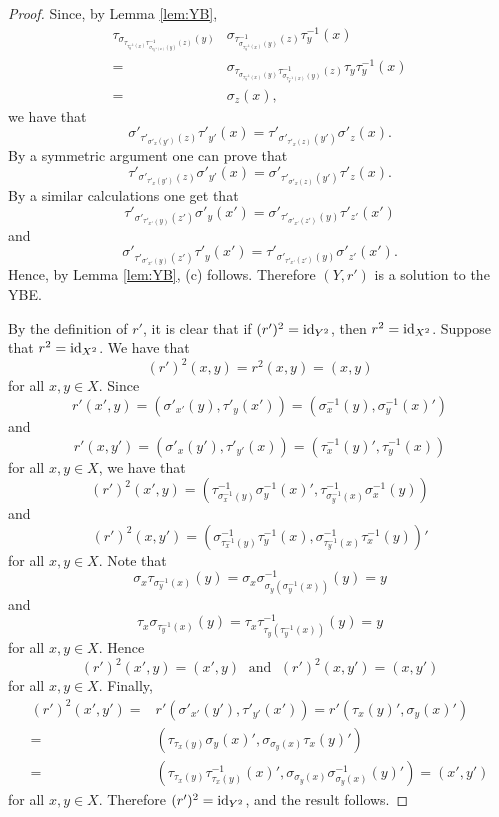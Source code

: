 \begin{proof}
Since, by Lemma \ref{lem:YB},
\begin{align*}
\tau_{\sigma_{\tau_{\tau^{-1}_y(x)}\tau^{-1}_{\sigma_{\tau^{-1}_y(x)}(y)}(z)}(y)}&\sigma_{\tau^{-1}_{\sigma_{\tau^{-1}_y(x)}(y)}(z)}\tau^{-1}_y(x)\\
=&\sigma_{\tau_{\sigma_{\tau^{-1}_y(x)}(y)}\tau^{-1}_{\sigma_{\tau^{-1}_y(x)}(y)}(z)} \tau_y{\tau^{-1}_y}(x)\\
=&\sigma_z(x), 
\end{align*}
we have that
\[\sigma'_{\tau'_{\sigma'_x(y')}(z)}\tau'_{y'}(x)=\tau'_{\sigma'_{\tau'_x(z)}(y')}\sigma'_{z}(x).\]
By a symmetric argument one can prove that
\[\tau'_{\sigma'_{\tau'_x(y')}(z)}\sigma'_{y'}(x)=\sigma'_{\tau'_{\sigma'_x(z)}(y')}\tau'_{z}(x).\]
By a similar calculations one get that
\[\tau'_{\sigma'_{\tau'_{x'}(y)}(z')}\sigma'_{y}(x')=\sigma'_{\tau'_{\sigma'_{x'}(z')}(y)}\tau'_{z'}(x')\]
and
\[\sigma'_{\tau'_{\sigma'_{x'}(y)}(z')}\tau'_{y}(x')=\tau'_{\sigma'_{\tau'_{x'}(z')}(y)}\sigma'_{z'}(x').\]
Hence, by Lemma \ref{lem:YB}, (c) follows. Therefore $(Y,r')$ is a solution to the YBE. 

By the definition of $r'$, it is clear that if $(r')^2=\operatorname{id}_{Y^2}$, then $r^2=\operatorname{id}_{X^2}$. Suppose that $r^2=\operatorname{id}_{X^2}$. We have that
\[ (r')^2(x,y)=r^2(x,y)=(x,y)\]
for all $x,y\in X$. Since
\[ r'(x',y)=(\sigma'_{x'}(y),\tau'_y(x'))=(\sigma^{-1}_x(y),\sigma^{-1}_y(x)')\]
and 
\[ r'(x,y')=(\sigma'_{x}(y'),\tau'_{y'}(x))=(\tau^{-1}_x(y)',\tau^{-1}_y(x))\]
for all $x,y\in X$, we have that
\[ (r')^2(x',y)=(\tau^{-1}_{\sigma^{-1}_x(y)}\sigma^{-1}_y(x)',\tau^{-1}_{\sigma^{-1}_y(x)}\sigma^{-1}_x(y))\]
and
\[ (r')^2(x,y')=(\sigma^{-1}_{\tau^{-1}_x(y)}\tau^{-1}_y(x),\sigma^{-1}_{\tau^{-1}_y(x)}\tau^{-1}_x(y))'\]
for all $x,y\in X$. Note that
\[\sigma_x\tau_{\sigma^{-1}_y(x)}(y)=\sigma_x\sigma^{-1}_{\sigma_y(\sigma^{-1}_y(x))}(y)=y\]
and
\[
\tau_x\sigma_{\tau^{-1}_y(x)}(y)=\tau_x\tau^{-1}_{\tau_y(\tau^{-1}_y(x))}(y)=y
\]
for all $x,y\in X$. Hence
\[ 
(r')^2(x',y)=(x',y)\; \text{ and }\; (r')^2(x,y')=(x,y')
\]
for all $x,y\in X$.
Finally, 
\begin{align*}
(r')^2(x',y')=&r'(\sigma'_{x'}(y'),\tau'_{y'}(x'))
=r'(\tau_x(y)',\sigma_y(x)')\\
=&(\tau_{\tau_{x}(y)}\sigma_y(x)',\sigma_{\sigma_y(x)}\tau_x(y)')\\
=&(\tau_{\tau_{x}(y)}\tau^{-1}_{\tau_x(y)}(x)',\sigma_{\sigma_y(x)}\sigma^{-1}_{\sigma_y(x)}(y)')=(x',y')
\end{align*}
for all $x,y\in X$. Therefore $(r')^2=\operatorname{id}_{Y^2}$, and the result follows.
\end{proof}

